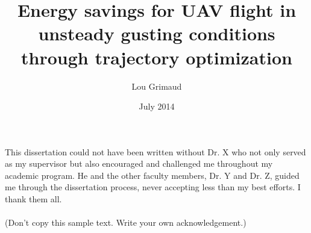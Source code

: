 \documentclass{iitthesis}
\begin{document}
\title{Energy savings for UAV flight in unsteady gusting conditions \\
  through trajectory optimization }
\author{Lou Grimaud}
\date{July 2014}
\maketitle                %


\prelimpages         %


\begin{acknowledgement}     %
  \par  This dissertation could not have been written without Dr. X
  who not only served as my supervisor but also encouraged and
  challenged me throughout my academic program. He and the other
  faculty members, Dr. Y and Dr. Z, guided me through the
  dissertation process, never accepting less than my best efforts. I
  thank them all.\\ \\ (Don't copy this sample text. Write your own
  acknowledgement.)
\end{acknowledgement}


\tableofcontents
\clearpage

\listoftables

\clearpage

\listoffigures

\clearpage


\listofsymbols
{}


\clearpage


\begin{abstract}           %
\end{abstract}
\end{document}
